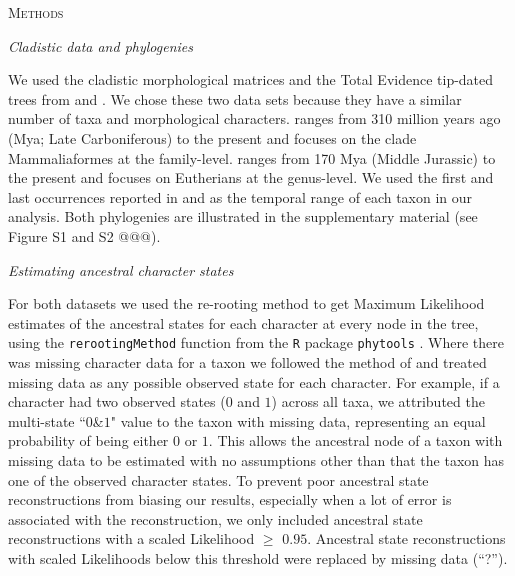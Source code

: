 \documentclass[12pt,letterpaper]{article}
\renewcommand{\section}[1]{%
\bigskip
\begin{center}
\begin{Large}
\normalfont\scshape #1
\medskip
\end{Large}
\end{center}}
\renewcommand{\subsection}[1]{%
\bigskip
\begin{center}
\begin{large}
\normalfont\itshape #1
\end{large}
\end{center}}
\begin{document}
%
%

\section{Methods}

\subsection{Cladistic data and phylogenies}
We used the cladistic morphological matrices and the Total Evidence tip-dated trees \citep{ronquista2012} from \citet[][103 taxa with 446 morphological characters]{Slater2012MEE} and \citet[][102 taxa with 421 morphological characters]{beckancient2014}.
We chose these two data sets because they have a similar number of taxa and morphological characters.
\cite{Slater2012MEE} ranges from 310 million years ago (Mya; Late Carboniferous) to the present and focuses on the clade Mammaliaformes at the family-level.
\cite{beckancient2014} ranges from 170 Mya (Middle Jurassic) to the present and focuses on Eutherians at the genus-level.
We used the first and last occurrences reported in \cite{Slater2012MEE} and \cite{beckancient2014} as the temporal range of each taxon in our analysis.
Both phylogenies are illustrated in the supplementary material (see Figure S1 and S2 @@@).

\subsection{Estimating ancestral character states}
For both datasets we used the re-rooting method \citep{Yang01121995,Garland2000} to get Maximum Likelihood estimates of the ancestral states for each character at every node in the tree, using the \texttt{rerootingMethod} function from the \texttt{R} package \texttt{phytools} \citep[version 0.4-45;][]{phytools,R}.
Where there was missing character data for a taxon we followed the method of \cite{Claddis} and treated missing data as any possible observed state for each character.
For example, if a character had two observed states ($0$ and $1$) across all taxa, we attributed the multi-state ``$0$\&$1$" value to the taxon with missing data, representing an equal probability of being either $0$ or $1$.
This allows the ancestral node of a taxon with missing data to be estimated with no assumptions other than that the taxon has one of the observed character states.
To prevent poor ancestral state reconstructions from biasing our results, especially when a lot of error is associated with the reconstruction, we only included ancestral state reconstructions with a scaled Likelihood $\geq$ $0.95$.
Ancestral state reconstructions with scaled Likelihoods below this threshold were replaced by missing data (``?'').
\end{document}
